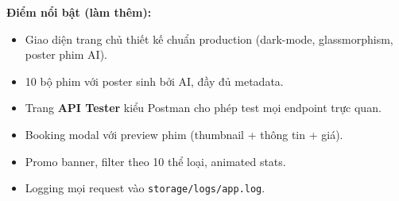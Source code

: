 \documentclass[12pt,a4paper]{article}
\begin{document}
\textbf{Điểm nổi bật (làm thêm):}
\begin{itemize}[noitemsep]
    \item Giao diện trang chủ thiết kế chuẩn production (dark-mode, glassmorphism, poster phim AI).
    \item 10 bộ phim với poster sinh bởi AI, đầy đủ metadata.
    \item Trang \textbf{API Tester} kiểu Postman cho phép test mọi endpoint trực quan.
    \item Booking modal với preview phim (thumbnail + thông tin + giá).
    \item Promo banner, filter theo 10 thể loại, animated stats.
    \item Logging mọi request vào \texttt{storage/logs/app.log}.
\end{itemize}
\end{document}
